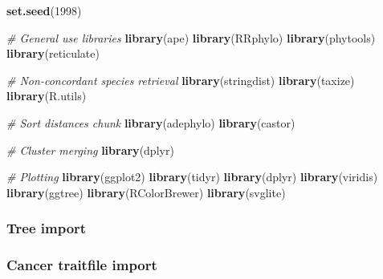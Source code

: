 \documentclass[
]{article}
\newenvironment{Shaded}{\begin{snugshade}}{\end{snugshade}}
\newcommand{\CommentTok}[1]{\textcolor[rgb]{0.56,0.35,0.01}{\textit{#1}}}
\newcommand{\DecValTok}[1]{\textcolor[rgb]{0.00,0.00,0.81}{#1}}
\newcommand{\FunctionTok}[1]{\textcolor[rgb]{0.13,0.29,0.53}{\textbf{#1}}}
\newcommand{\NormalTok}[1]{#1}
\newcommand{\OtherTok}[1]{\textcolor[rgb]{0.56,0.35,0.01}{#1}}
\newcommand{\SpecialCharTok}[1]{\textcolor[rgb]{0.81,0.36,0.00}{\textbf{#1}}}
\newcommand{\StringTok}[1]{\textcolor[rgb]{0.31,0.60,0.02}{#1}}
\begin{document}
\begin{Shaded}
\begin{Highlighting}[]
\FunctionTok{set.seed}\NormalTok{(}\DecValTok{1998}\NormalTok{)}

\CommentTok{\# General use libraries}
\FunctionTok{library}\NormalTok{(ape)}
\FunctionTok{library}\NormalTok{(RRphylo)}
\FunctionTok{library}\NormalTok{(phytools)}
\FunctionTok{library}\NormalTok{(reticulate)}

\CommentTok{\# Non{-}concordant species retrieval }
\FunctionTok{library}\NormalTok{(stringdist)}
\FunctionTok{library}\NormalTok{(taxize)}
\FunctionTok{library}\NormalTok{(R.utils)}

\CommentTok{\# Sort distances chunk}
\FunctionTok{library}\NormalTok{(adephylo)}
\FunctionTok{library}\NormalTok{(castor)}

\CommentTok{\# Cluster merging}
\FunctionTok{library}\NormalTok{(dplyr)}

\CommentTok{\# Plotting}
\FunctionTok{library}\NormalTok{(ggplot2)}
\FunctionTok{library}\NormalTok{(tidyr)}
\FunctionTok{library}\NormalTok{(dplyr)}
\FunctionTok{library}\NormalTok{(viridis)}
\FunctionTok{library}\NormalTok{(ggtree)}
\FunctionTok{library}\NormalTok{(RColorBrewer)}
\FunctionTok{library}\NormalTok{(svglite)}
\end{Highlighting}
\end{Shaded}

\hypertarget{tree-import}{%
\subsubsection{Tree import}\label{tree-import}}

\begin{Shaded}
\end{Shaded}

\hypertarget{cancer-traitfile-import}{%
\subsubsection{Cancer traitfile import}\label{cancer-traitfile-import}}
\end{document}
